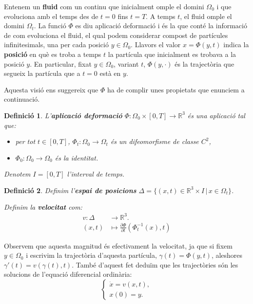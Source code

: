 \documentclass{article}
\numberwithin{equation}{section}
\newtheorem{definicio}{Definici\'{o}}[section]
\begin{document}
Entenem un \textbf{fluid} com un continu que inicialment omple el domini $\Omega_0$ i que evoluciona amb el temps des de $t=0$ fins $t=T$. A temps $t$, el fluid omple el domini $\Omega_t$. La funci\'{o} $\Phi$ es diu aplicaci\'{o} deformaci\'{o} i \'{e}s la que cont\'{e} la informaci\'{o} de com evoluciona el fluid, el qual podem considerar compost de part\'{i}cules infinitesimals, una per cada posici\'{o} $y\in\Omega_0$. Llavors el valor $x=\Phi(y,t)$ indica la \textbf{posici\'{o}} en qu\`{e} es troba a temps $t$ la part\'{i}cula que inicialment es trobava a la posici\'{o} $y$. En particular, fixat $y\in\Omega_0$, variant $t$, $\Phi(y,\cdot)$ \'{e}s la traject\`{o}ria que segueix la part\'{i}cula que a $t=0$ est\`{a} en $y$.

Aquesta visi\'{o} ens suggereix que $\Phi$ ha de complir unes propietats que enunciem a continuaci\'{o}.

\begin{definicio}
L'\textbf{aplicaci\'{o} deformaci\'{o}} $\Phi:\Omega_0\times[0,T]\rightarrow\mathbb{R}^3$ \'{e}s una aplicaci\'{o} tal que:
\begin{itemize}
\item per tot $t\in[0,T]$, $\Phi_t:\Omega_0\rightarrow\Omega_t$ \'{e}s un difeomorfisme de classe $C^2$,
\item $\Phi_0:\Omega_0\rightarrow\Omega_0$ \'{e}s la identitat.
\end{itemize}

Denotem $I=[0,T]$ l'interval de temps.
\end{definicio}

\begin{definicio}
Definim l'\textbf{espai de posicions} $\Delta=\{(x,t)\in\mathbb{R}^3\times I\,|\,x\in\Omega_t\}$.

Definim la \textbf{velocitat} com:
\[
\begin{split}
v:\Delta&\longrightarrow\mathbb{R}^3.\\
(x,t)&\longmapsto\frac{\partial\Phi}{\partial t}(\Phi_t^{-1}(x),t)
\end{split}
\]
\end{definicio}

Observem que aquesta magnitud \'{e}s efectivament la velocitat, ja que si fixem $y\in\Omega_0$ i escrivim la traject\`{o}ria d'aquesta part\'{i}cula, $\gamma(t)=\Phi(y,t)$, aleshores $\gamma'(t)=v(\gamma(t),t)$. Tamb\'{e} d'aquest fet dedu\"{i}m que les traject\`{o}ries s\'{o}n les solucions de l'equaci\'{o} diferencial ordin\`{a}ria:
\begin{equation}\label{Equ. trajectoria}
\left\{\begin{array}{l}\dot{x}=v(x,t),\\x(0)=y.\end{array}\right.
\end{equation}
\end{document}
